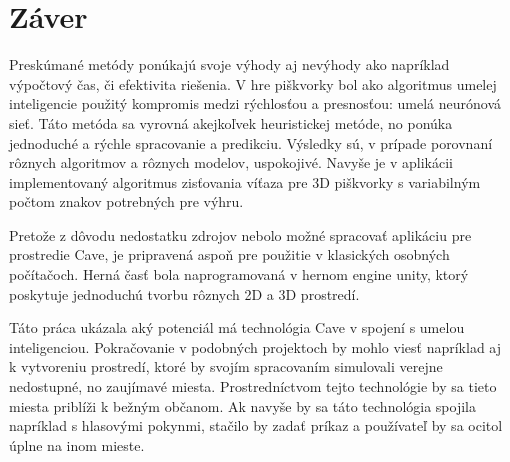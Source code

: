 \section{Záver}\label{sec:conclusion}

Preskúmané metódy ponúkajú svoje výhody aj nevýhody ako napríklad výpočtový čas, či efektivita riešenia.
V hre piškvorky bol ako algoritmus umelej inteligencie použitý kompromis medzi rýchlosťou a presnosťou: umelá neurónová
sieť.
Táto metóda sa vyrovná akejkoľvek heuristickej metóde, no ponúka jednoduché a rýchle spracovanie a predikciu.
Výsledky sú, v prípade porovnaní rôznych algoritmov a rôznych modelov, uspokojivé.
Navyše je v aplikácii implementovaný algoritmus zisťovania víťaza pre 3D piškvorky s variabilným počtom znakov
potrebných pre výhru.

Pretože z dôvodu nedostatku zdrojov nebolo možné spracovať aplikáciu pre prostredie Cave, je pripravená aspoň pre
použitie v klasických osobných počítačoch.
Herná časť bola naprogramovaná v hernom engine unity, ktorý poskytuje jednoduchú tvorbu rôznych 2D a 3D prostredí.

Táto práca ukázala aký potenciál má technológia Cave v spojení s umelou inteligenciou.
Pokračovanie v podobných projektoch by mohlo viesť napríklad aj k vytvoreniu prostredí, ktoré by svojím spracovaním
simulovali verejne nedostupné, no zaujímavé miesta.
Prostredníctvom tejto technológie by sa tieto miesta priblíži k bežným občanom.
Ak navyše by sa táto technológia spojila napríklad s hlasovými pokynmi, stačilo by zadať príkaz a používateľ by sa
ocitol úplne na inom mieste.
